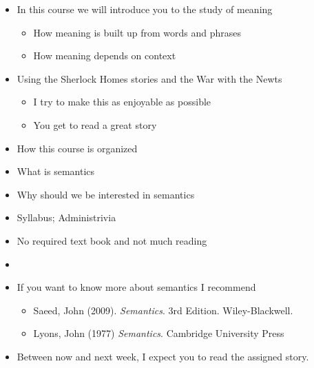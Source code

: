 \documentclass[a4paper,landscape,headrule,footrule,xetex,25pt]{foils}
\begin{document}
\maketitle

%



\begin{itemize}
\item In this course we will introduce you to the study of meaning
  \begin{itemize}
  \item How meaning is built up from words and phrases
  \item How meaning depends on context
  \end{itemize}
\item Using the Sherlock Homes stories and the War with the Newts
  \begin{itemize}
  \item I try to make this as enjoyable as possible
  \item You get to read  a great story
  \end{itemize}
\end{itemize}



\begin{itemize}
\item How this course is organized
\item What is semantics
\item Why should we be interested in semantics
\item Syllabus; Administrivia
\end{itemize}





\begin{itemize}
\item No required text book and not much reading
\item {}
\item If you want to know more about semantics I recommend
  \begin{itemize}
  \item Saeed, John (2009). \textit{Semantics}. 3rd Edition. Wiley-Blackwell. 
  \item Lyons, John (1977) \textit{Semantics}.  Cambridge University Press
  \end{itemize}
\item Between now and next week, I expect you to read the assigned story.
\end{itemize}
\end{document}
